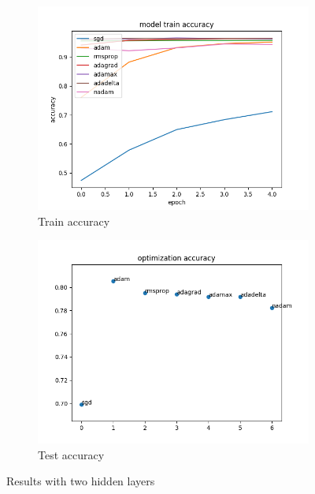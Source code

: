 \documentclass{article}
\begin{document}
\begin{figure}[H]
    \centering
    \begin{subfigure}[b]{0.7\textwidth}
        \includegraphics[width=\textwidth]{2layers20481024trainacc.png}
        \caption{Train accuracy}
        \label{fig:twolayertrainacc}
    \end{subfigure}
    \begin{subfigure}[b]{0.7\textwidth}
        \includegraphics[width=\textwidth]{high_maxword_total_opt_acc.png}
        \caption{Test accuracy}
        \label{fig:twolayertestacc}
    \end{subfigure}
    \caption{Results with two hidden layers}\label{fig:rtl}
\end{figure}
\end{document}
